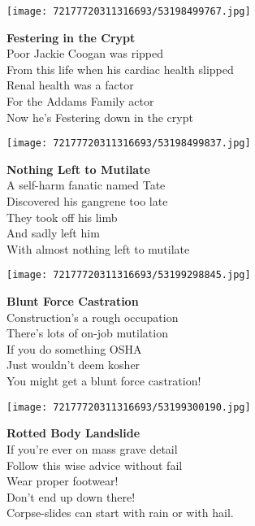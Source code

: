 \documentclass[10pt,letterpaper]{article}
\begin{document}
\begin{center}
\texttt{[image: 72177720311316693/53198499767.jpg]}
\end{center}
\begin{center}
\textbf{Festering in the Crypt}\\
\vskip 0.2in
Poor Jackie Coogan was ripped\\
From this life when his cardiac health slipped\\
Renal health was a factor\\
For the Addams Family actor\\
Now he's Festering down in the crypt\\
\end{center}
\pagebreak

\begin{center}\texttt{[image: 72177720311316693/53198499837.jpg]}
\end{center}
\begin{center}
\textbf{Nothing Left to Mutilate}\\
\vskip 0.2in
A self-harm fanatic named Tate\\
Discovered his gangrene too late\\
They took off his limb\\
And sadly left him\\
With almost nothing left to mutilate\\
\end{center}
\pagebreak

\begin{center}
\texttt{[image: 72177720311316693/53199298845.jpg]}
\end{center}

\begin{center}
\textbf{Blunt Force Castration}\\
\vskip 0.2in
Construction's a rough occupation\\
There's lots of on-job mutilation\\
If you do something OSHA\\
Just wouldn't deem kosher\\
You might get a blunt force castration!\\
\end{center}
\pagebreak

\begin{center}\texttt{[image: 72177720311316693/53199300190.jpg]}
\end{center}
\begin{center}
\textbf{Rotted Body Landslide}\\
\vskip 0.2in
If you're ever on mass grave detail\\
Follow this wise advice without fail\\
Wear proper footwear!\\
Don't end up down there!\\
Corpse-slides can start with rain or with hail.\\
\end{center}
\pagebreak
\end{document}
